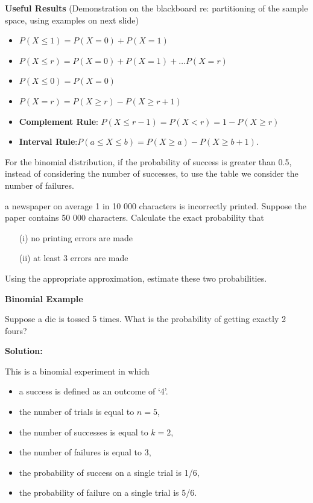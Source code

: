 {\textbf{Useful Results}
(Demonstration on the blackboard re: partitioning of the sample space, using examples on next slide)
\begin{itemize}
\item $P(X \leq 1) = P(X=0) + P(X=1)$
\item $P(X \leq r) = P(X=0)+ P(X=1) + \ldots P(X= r)$
\item $P(X \leq 0) = P(X=0)$
\item $P(X = r) = P(X \geq r ) - P(X \geq r + 1)$
\item \textbf{Complement Rule}: $P(X \leq r-1) = P(X < r) = 1 - P(X \geq r)$
\item \textbf{Interval Rule}:$ P(a \leq X \leq  b)= P(X \geq a) - P(X \geq b + 1).$
\end{itemize}
For the binomial distribution, if the probability of success is greater than 0.5, instead of
considering the number of successes, to use the table we consider
the number of failures.




\itemIn a newspaper on average 1 in 10 000 characters is incorrectly printed. Suppose the paper contains 50 000 characters. Calculate the exact probability that 
\begin{itemize}
\item[(i)]no printing errors are made
\item[(ii)]at least 3 errors are made
\end{itemize}
Using the appropriate approximation, estimate these two probabilities. 

\textbf{Binomial Example }

Suppose a die is tossed 5 times. What is the probability of getting exactly 2 fours?

\textbf{Solution:}

This is a binomial experiment in which \begin{itemize}\item a success is defined as an outcome of `4'. \item the number of trials is equal to $n=5$, \item the number of successes is equal to $k=2$,\item the number of failures is equal to 3, \item  the probability of success on a single trial is 1/6, \item  the probability of failure on a single trial is 5/6.\end{itemize}

}
